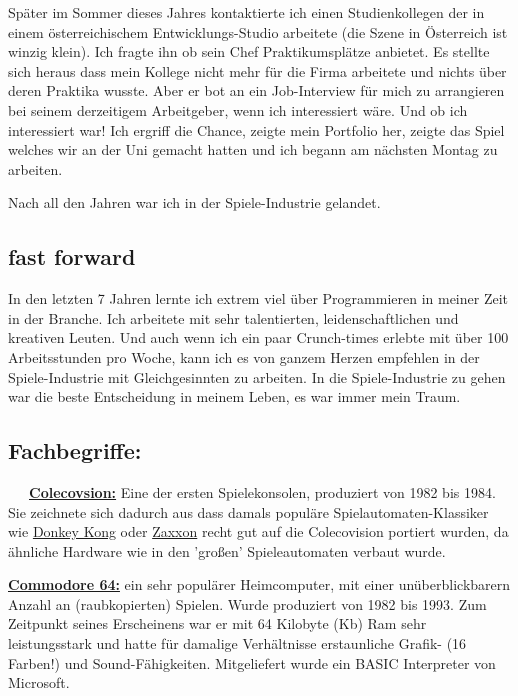 Später im Sommer dieses Jahres kontaktierte ich einen Studienkollegen der in einem österreichischem Entwicklungs-Studio arbeitete (die Szene in Österreich ist winzig klein). Ich fragte ihn ob sein Chef Praktikumsplätze anbietet. Es stellte sich heraus dass mein Kollege nicht mehr für die Firma arbeitete und nichts über deren Praktika wusste. Aber er bot an ein Job-Interview für mich zu arrangieren bei seinem derzeitigem Arbeitgeber, wenn ich interessiert wäre. Und ob ich interessiert war! Ich ergriff die Chance, zeigte mein Portfolio her, zeigte das Spiel welches wir an der Uni gemacht hatten und ich begann am nächsten Montag zu arbeiten.

Nach all den Jahren war ich in der Spiele-Industrie gelandet.

\subsection*{fast forward}

In den letzten 7 Jahren lernte ich extrem viel über Programmieren in meiner Zeit in der Branche. Ich arbeitete mit sehr talentierten, leidenschaftlichen und kreativen Leuten. Und auch wenn ich ein paar Crunch-times erlebte mit über 100 Arbeitsstunden pro Woche, kann ich es von ganzem Herzen empfehlen in der Spiele-Industrie mit Gleichgesinnten zu arbeiten. In die Spiele-Industrie zu gehen war die beste Entscheidung in meinem Leben, es war immer mein Traum.

\subsection*{Fachbegriffe:}
~~~\href{https://de.wikipedia.org/wiki/Colecovision}{\textbf{Colecovsion:}} Eine der ersten Spielekonsolen, produziert von 1982 bis 1984. Sie zeichnete sich dadurch aus dass damals populäre Spielautomaten-Klassiker wie \href{https://de.wikipedia.org/wiki/Donkey_Kong}{Donkey Kong} oder \href{https://de.wikipedia.org/wiki/Zaxxon}{Zaxxon} recht gut auf die Colecovision portiert wurden, da ähnliche Hardware wie in den 'großen' Spieleautomaten verbaut wurde.

\href{https://de.wikipedia.org/wiki/Commodore_64}{\textbf{Commodore 64:}} ein sehr populärer Heimcomputer, mit einer unüberblickbarern Anzahl an (raubkopierten) Spielen. Wurde produziert von 1982 bis 1993. Zum Zeitpunkt seines Erscheinens war er mit 64 Kilobyte (Kb) Ram sehr leistungsstark und hatte für damalige Verhältnisse erstaunliche Grafik- (16 Farben!) und Sound-Fähigkeiten. Mitgeliefert wurde ein BASIC Interpreter von Microsoft.

